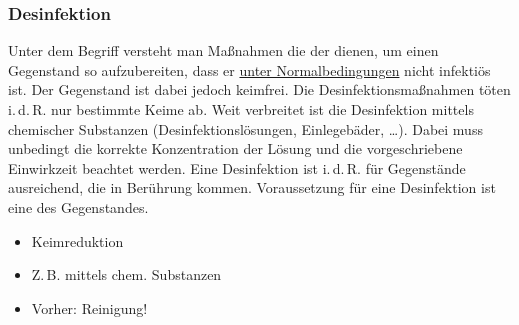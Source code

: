 \subsubsection{Desinfektion}
\label{topic:desinfektion-grundzuege}

{%
Unter dem Begriff  versteht man Maßnahmen
die der  dienen, um einen Gegenstand so
aufzubereiten, dass er \underline{unter Normalbedingungen}
nicht infektiös ist. Der Gegenstand ist dabei jedoch
 keimfrei. Die Desinfektionsmaßnahmen töten
i.\,d.\,R. nur bestimmte Keime ab. Weit verbreitet ist die
Desinfektion mittels chemischer Substanzen
(Desinfektionslösungen, Einlegebäder, \ldots). Dabei muss
unbedingt die korrekte Konzentration der Lösung und die
vorgeschriebene Einwirkzeit beachtet werden.
Eine Desinfektion ist i.\,d.\,R. für Gegenstände
ausreichend, die  in Berührung
kommen.
Voraussetzung für eine Desinfektion ist eine
 des Gegenstandes.
}{
\begin{itemize}
  \item Keimreduktion
  \item Z.\,B. mittels chem. Substanzen
  \item Vorher: Reinigung!
\end{itemize}
}{}{}{}


